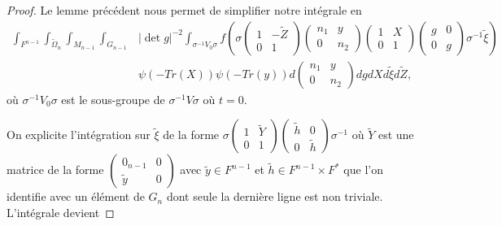 \documentclass{amsart}
\begin{document}
\begin{proof}
Le lemme précédent nous permet de simplifier notre intégrale en
\begin{equation}
\begin{split}
\int_{F^{n-1}} \int_{\widetilde{\Omega}_n} \int_{M_{n-1}} \int_{G_{n-1}}  & |\det g|^{-2}\int_{\sigma^{-1}V_0\sigma} f\left(\sigma \begin{pmatrix}
1 & -\widetilde{Z} \\
0 & 1
\end{pmatrix}  \begin{pmatrix}
n_1 & y \\
0 & n_2
\end{pmatrix} \begin{pmatrix}
1 & X \\
0 & 1
\end{pmatrix} \begin{pmatrix}
g & 0 \\
0 & g
\end{pmatrix} \sigma^{-1} \widetilde{\xi}\right) \\
& \psi(-Tr(X)) \psi(-Tr(y))  d\begin{pmatrix}
n_1 & y \\
0 & n_2
\end{pmatrix} dg dX d\widetilde{\xi} d\widetilde{Z},
\end{split}
\end{equation}
où $\sigma^{-1}V_0\sigma$ est le sous-groupe de $\sigma^{-1}V\sigma$ où $t=0$.

On explicite l'intégration sur $\widetilde{\xi}$ de la forme $\sigma \begin{pmatrix}
1 & \widetilde{Y} \\
0 & 1
\end{pmatrix}\begin{pmatrix}
\widetilde{h} & 0 \\
0 & \widetilde{h}
\end{pmatrix} \sigma^{-1}$
où $\widetilde{Y}$ est une matrice de la forme $\begin{pmatrix}
0_{n-1} & 0 \\
\widetilde{y} & 0
\end{pmatrix}$ avec $\widetilde{y} \in F^{n-1}$ et $\widetilde{h} \in F^{n-1} \times F^*$ que l'on identifie avec un élément de $G_n$ dont seule la dernière ligne est non triviale. L'intégrale devient


\end{proof}
\end{document}
